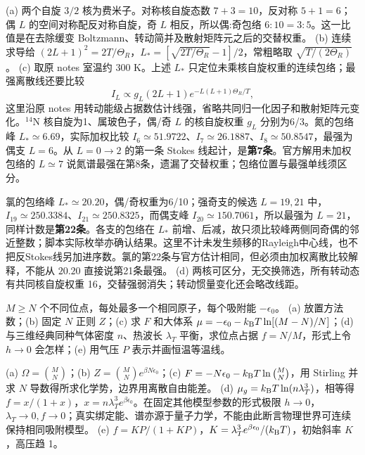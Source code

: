 \begin{solution}
(a) 两个自旋 $3/2$ 核为费米子。对称核自旋态数 $7+3=10$，反对称 $5+1=6$；偶 $L$ 的空间对称配反对称自旋，奇 $L$ 相反，所以偶:奇包络 $6:10=3:5$。这一比值是在去除缓变 Boltzmann、转动简并及散射矩阵元之后的交替权重。
(b) 连续求导给 $(2L+1)^2=2T/\Theta_R$，$L_*=[\sqrt{2T/\Theta_R}-1]/2$，常粗略取 $\sqrt{T/(2\Theta_R)}$。
(c) 取原 notes 室温约 300 K。上述 $L_*$ 只定位未乘核自旋权重的连续包络；最强离散线还要比较
\[I_L\propto g_L(2L+1)e^{-L(L+1)\Theta_R/T},\]
这里沿原 notes 用转动能级占据数估计线强，省略共同归一化因子和散射矩阵元变化。$^{14}$N 核自旋为1、属玻色子，偶/奇 $L$ 的核自旋权重 $g_L$ 分别为6/3。氮的包络峰 $L_*\simeq6.69$，实际加权比较 $I_6\simeq51.9722$、$I_7\simeq26.1887$、$I_8\simeq50.8547$，最强为偶支 $L=6$。从 $L=0\to2$ 的第一条 Stokes 线起计，是\textbf{第7条}。官方解用未加权包络的 $L\simeq7$ 说氮谱最强在第8条，遗漏了交替权重；包络位置与最强单线须区分。

氯的包络峰 $L_*\simeq20.20$，偶/奇权重为6/10；强奇支的候选 $L=19,21$ 中，$I_{19}\simeq250.3384$、$I_{21}\simeq250.8325$，而偶支峰 $I_{20}\simeq150.7061$，所以最强为 $L=21$，同样计数是\textbf{第22条}。各支的包络在 $L_*$ 前增、后减，故只须比较峰两侧同奇偶的邻近整数；脚本实际枚举亦确认结果。这里不计未发生频移的Rayleigh中心线，也不把反Stokes线另加进序数。氯的第22条与官方估计相同，但必须由加权离散比较解释，不能从 $20.20$ 直接说第21条最强。
(d) 两核可区分，无交换筛选，所有转动态有共同核自旋权重 16，交替强弱消失；转动惯量变化还会略改线距。
\end{solution}
\begin{exercise}
$M\ge N$ 个不同位点，每处最多一个相同原子，每个吸附能 $-\epsilon_0$。
(a) 放置方法数；(b) 固定 $N$ 正则 $Z$；(c) 求 $F$ 和大体系 $\mu=-\epsilon_0-k_{\mathrm B} T\ln[(M-N)/N]$；(d) 与三维经典同种气体密度 $n$、热波长 $\lambda_T$ 平衡，求位点占据 $f=N/M$，形式上令 $h\to0$ 会怎样；(e) 用气压 $P$ 表示并画恒温等温线。
\end{exercise}
\begin{solution}
(a) $\Omega=\binom MN$；(b) $Z=\binom MN e^{\beta N\epsilon_0}$；(c) $F=-N\epsilon_0-k_{\mathrm B} T\ln\binom MN$，用 Stirling 并求 $N$ 导数得所求化学势，边界用离散自由能差。
(d) $\mu_g=k_{\mathrm B} T\ln(n\lambda_T^3)$，相等得 $f=x/(1+x)$，$x=n\lambda_T^3e^{\beta\epsilon_0}$。在固定其他模型参数的形式极限 $h\to0$，$\lambda_T\to0,f\to0$；真实绑定能、谱亦源于量子力学，不能由此断言物理世界可连续保持相同吸附模型。
(e) $f=KP/(1+KP)$，$K=\lambda_T^3e^{\beta\epsilon_0}/(k_{\mathrm B} T)$，初始斜率 $K$，高压趋 1。
\end{solution}
